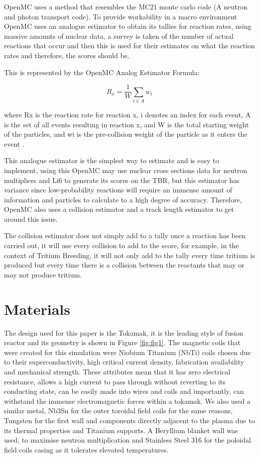 \documentclass{article}
\begin{document}
OpenMC uses a method that resembles the MC21 monte carlo code (A neutron and photon transport code). To provide workability in a macro environment OpenMC uses an analogue estimator to obtain its tallies for reaction rates, using massive amounts of nuclear data, a survey is taken of the number of actual reactions that occur and then this is used for their estimates on what the reaction rates and therefore, the scores should be. 

This is represented by the OpenMC Analog Estimator Formula:

\begin{equation}
R_x = \frac{1}{W} \sum_{i \in A} w_i
\end{equation}

where Rx is the reaction rate for reaction x, i denotes an index for each event, A is the set of all events resulting in reaction x, and W is the total starting weight of the particles, and wi is the pre-collision weight of the particle as it enters the event \cite{rhhnfs15}. 

This analogue estimator is the simplest way to estimate and is easy to implement, using this OpenMC may use nuclear cross sections data for neutron multipliers and Li6 to generate its scores on the TBR, but this estimator has variance since low-probability reactions will require an immense amount of information and particles to calculate to a high degree of accuracy. Therefore, OpenMC also uses a collision estimator and a track length estimator to get around this issue.

The collision estimator does not simply add to a tally once a reaction has been carried out, it will use every collision to add to the score, for example, in the context of Tritium Breeding, it will not only add to the tally every time tritium is produced but every time there is a collision between the reactants that may or may not produce tritium.

\section{Materials}

The design used for this paper is the Tokamak, it is the leading style of fusion reactor and its geometry is shown in Figure \ref{fig:fig1}. The magnetic coils that were created for this simulation were Niobium Titanium (NbTi) coils chosen due to their superconductivity, high critical current density, fabrication availability and mechanical strength. These attributes mean that it has zero electrical resistance, allows a high current to pass through without reverting to its conducting state, can be easily made into wires and coils and importantly, can withstand the immense electromagnetic forces within a tokamak. We also used a similar metal, Nb3Sn for the outer toroidal field coils for the same reasons, Tungsten for the first wall and components directly adjacent to the plasma due to its thermal properties and Titanium supports. A Beryllium blanket wall was used, to maximise neutron multiplication and Stainless Steel 316 for the poloidal field coils casing as it tolerates elevated temperatures.
\end{document}
